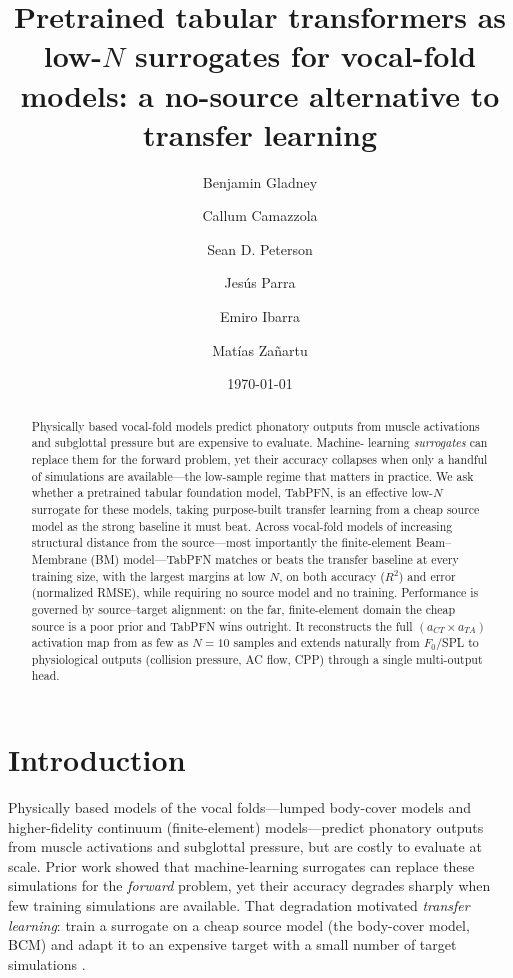 \documentclass[11pt]{article}
\title{Pretrained tabular transformers as low-$N$ surrogates for
vocal-fold models: a no-source alternative to transfer learning}
\author{Benjamin Gladney \and Callum Camazzola \and Sean D. Peterson \and
Jes\'us Parra \and Emiro Ibarra \and Mat\'ias Za\~nartu}
\date{\today}
\begin{document}
\maketitle

\begin{abstract}
Physically based vocal-fold models predict phonatory outputs from muscle
activations and subglottal pressure but are expensive to evaluate. Machine-
learning \emph{surrogates} can replace them for the forward problem, yet their
accuracy collapses when only a handful of simulations are available---the
low-sample regime that matters in practice. We ask whether a pretrained tabular
foundation model, TabPFN, is an effective low-$N$ surrogate for these models,
taking purpose-built transfer learning from a cheap source model as the strong
baseline it must beat. Across vocal-fold models of increasing structural
distance from the source---most importantly the finite-element Beam--Membrane
(BM) model---TabPFN matches or beats the transfer baseline at every training
size, with the largest margins at low $N$, on both accuracy ($R^2$) and error
(normalized RMSE), while requiring no source model and no training. Performance
is governed by source--target alignment: on the far, finite-element domain the
cheap source is a poor prior and TabPFN wins outright. It reconstructs the full
$(a_{CT}\times a_{TA})$ activation map from as few as $N{=}10$ samples and
extends naturally from $F_0$/SPL to physiological outputs (collision pressure,
AC flow, CPP) through a single multi-output head.
\end{abstract}

\section{Introduction}
\label{sec:intro}
Physically based models of the vocal folds---lumped body-cover models and
higher-fidelity continuum (finite-element) models---predict phonatory outputs
from muscle activations and subglottal pressure, but are costly to evaluate at
scale. Prior work showed that machine-learning surrogates can replace these
simulations for the \emph{forward} problem, yet their accuracy degrades sharply
when few training simulations are available. That degradation motivated
\emph{transfer learning}: train a surrogate on a cheap source model (the
body-cover model, BCM) and adapt it to an expensive target with a small number
of target simulations \citep{TODOprior}.
\end{document}
